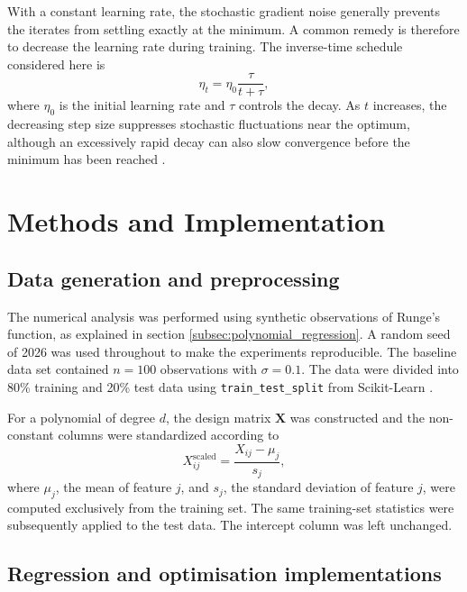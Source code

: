 \documentclass[aps,rmp,reprint,amsmath,amssymb,graphicx,longbibliography]{revtex4-1}
\begin{document}
With a constant learning rate, the stochastic gradient noise generally
prevents the iterates from settling exactly at the minimum. A common remedy
is therefore to decrease the learning rate during training. The inverse-time
schedule considered here is
\begin{equation}
    \eta_t
    =
    \eta_0
    \frac{\tau}{t+\tau},
    \label{eq:sgd_schedule}
\end{equation}
where $\eta_0$ is the initial learning rate and $\tau$ controls the decay.
As $t$ increases, the decreasing step size suppresses stochastic
fluctuations near the optimum, although an excessively rapid decay can also
slow convergence before the minimum has been reached
\cite{HjorthJensen2026MLPSCh4}.

\section{Methods and Implementation}

\subsection{Data generation and preprocessing}

The numerical analysis was performed using synthetic observations of Runge's function, as explained in section \ref{subsec:polynomial_regression}. A random seed of 2026 was used throughout to make the experiments reproducible. The baseline data set contained $n=100$ observations with $\sigma=0.1$. The data were divided into 80\% training and 20\% test data using \texttt{train\_test\_split} from Scikit-Learn \cite{ScikitLearn2026}. 

For a polynomial of degree $d$, the design matrix $\mathbf{X}$ was constructed and the non-constant columns were standardized according to
\begin{equation}
    X_{ij}^{\mathrm{scaled}}
    =
    \frac{X_{ij}-\mu_j}{s_j},
\end{equation}
where $\mu_j$, the mean of feature $j$, and $s_j$, the standard deviation of feature $j$, were computed exclusively from the training set. The same training-set statistics were subsequently applied to the test data. The intercept column was left unchanged. 

\subsection{Regression and optimisation implementations}
\label{subsec:Regression and optimisation}
\end{document}

